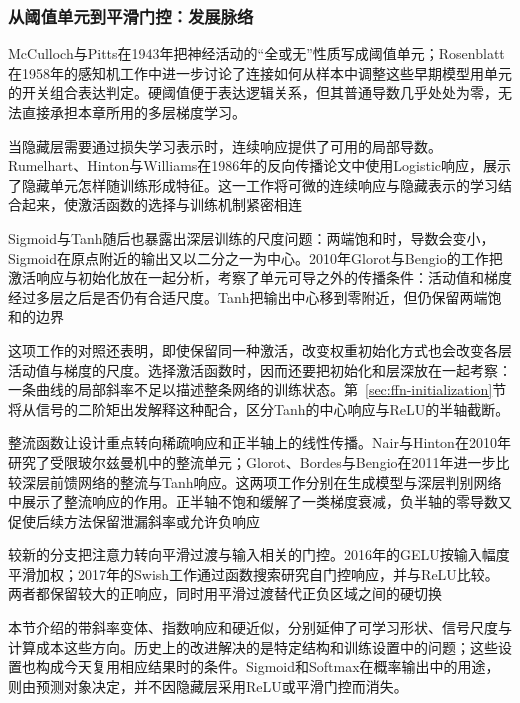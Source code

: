 \subsubsection{从阈值单元到平滑门控：发展脉络}
\label{sec:ffn-activation-history}

McCulloch与Pitts在1943年把神经活动的“全或无”性质写成阈值单元；Rosenblatt在1958年的感知机工作中进一步讨论了连接如何从样本中调整这些早期模型用单元的开关组合表达判定。硬阈值便于表达逻辑关系，但其普通导数几乎处处为零，无法直接承担本章所用的多层梯度学习。

当隐藏层需要通过损失学习表示时，连续响应提供了可用的局部导数。Rumelhart、Hinton与Williams在1986年的反向传播论文中使用Logistic响应，展示了隐藏单元怎样随训练形成特征。这一工作将可微的连续响应与隐藏表示的学习结合起来，使激活函数的选择与训练机制紧密相连

Sigmoid与Tanh随后也暴露出深层训练的尺度问题：两端饱和时，导数会变小，Sigmoid在原点附近的输出又以二分之一为中心。2010年Glorot与Bengio的工作把激活响应与初始化放在一起分析，考察了单元可导之外的传播条件：活动值和梯度经过多层之后是否仍有合适尺度。Tanh把输出中心移到零附近，但仍保留两端饱和的边界

这项工作的对照还表明，即使保留同一种激活，改变权重初始化方式也会改变各层活动值与梯度的尺度。选择激活函数时，因而还要把初始化和层深放在一起考察：一条曲线的局部斜率不足以描述整条网络的训练状态。第~\ref{sec:ffn-initialization}节将从信号的二阶矩出发解释这种配合，区分Tanh的中心响应与ReLU的半轴截断。

整流函数让设计重点转向稀疏响应和正半轴上的线性传播。Nair与Hinton在2010年研究了受限玻尔兹曼机中的整流单元；Glorot、Bordes与Bengio在2011年进一步比较深层前馈网络的整流与Tanh响应。这两项工作分别在生成模型与深层判别网络中展示了整流响应的作用。正半轴不饱和缓解了一类梯度衰减，负半轴的零导数又促使后续方法保留泄漏斜率或允许负响应

较新的分支把注意力转向平滑过渡与输入相关的门控。2016年的GELU按输入幅度平滑加权；2017年的Swish工作通过函数搜索研究自门控响应，并与ReLU比较。两者都保留较大的正响应，同时用平滑过渡替代正负区域之间的硬切换

本节介绍的带斜率变体、指数响应和硬近似，分别延伸了可学习形状、信号尺度与计算成本这些方向。历史上的改进解决的是特定结构和训练设置中的问题；这些设置也构成今天复用相应结果时的条件。Sigmoid和Softmax在概率输出中的用途，则由预测对象决定，并不因隐藏层采用ReLU或平滑门控而消失。

